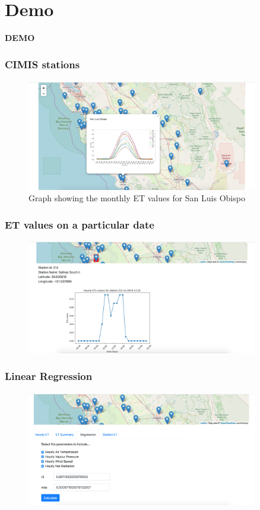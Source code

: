 \section{Demo}
\begin{frame}
	\begin{center}
		{\fontsize{20}{20}\selectfont
			\textbf{DEMO}
		}
	\end{center}
\end{frame}

\begin{frame}
	\frametitle{CIMIS stations}
	\centering
	\begin{figure}
		\includegraphics[width=0.9\textwidth]{images/fig1.png}
		\caption{Graph showing the monthly ET values for San Luis Obispo}\label{fig:fig1}
	\end{figure}
\end{frame}

\begin{frame}
	\frametitle{ET values on a particular date}
	\centering
	\begin{figure}
		\includegraphics[width=0.9\textwidth]{images/fig2.png}
	\end{figure}
\end{frame}

\begin{frame}
	\frametitle{Linear Regression}
	\centering
	\begin{figure}
		\includegraphics[width=0.9\textwidth]{images/fig3.png}
	\end{figure}
\end{frame}

